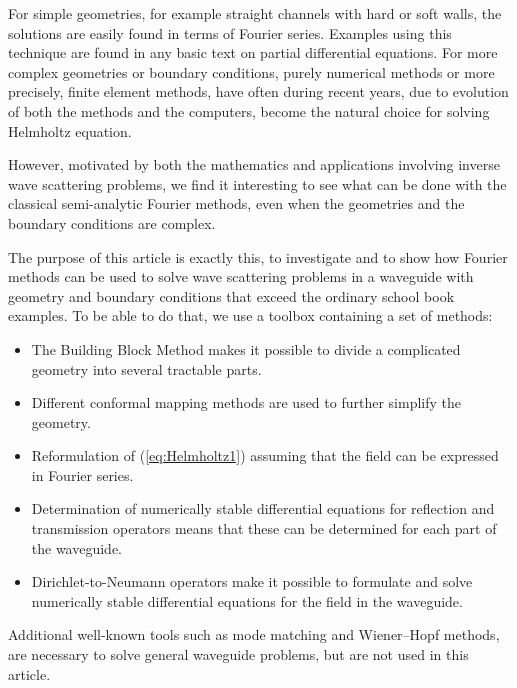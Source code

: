 \documentclass[numreferences]{kluwer}
\begin{document}
For simple geometries, for example straight channels with hard or soft
walls, the solutions are easily found in terms of Fourier
series. Examples using this technique are found in any basic text on
partial differential equations. For more complex geometries or
boundary conditions, purely numerical methods or more precisely,
finite element methods, have often during recent years, due to
evolution of both the methods and the computers, become the natural
choice for solving Helmholtz equation.


However, motivated by both the mathematics and applications involving
inverse wave scattering problems, we find it interesting to see what
can be done with the classical semi-analytic Fourier methods, even
when the geometries and the boundary conditions are complex.

The purpose of this article is exactly this, to investigate and to
show how Fourier methods can be used to solve wave scattering problems
in a waveguide with geometry and boundary conditions that exceed the
ordinary school book examples. To be able to do that, we use a toolbox
containing a set of methods:
\begin{itemize}
\item The Building Block Method makes it possible to divide a
  complicated geometry into several tractable parts.
\item Different conformal mapping methods are used to further simplify
  the geometry.
\item Reformulation of (\ref{eq:Helmholtz1}) assuming that the field
  can be expressed in Fourier series.
\item Determination of numerically stable differential equations for
  reflection and transmission operators means that these can be
  determined for each part of the waveguide.
\item Dirichlet-to-Neumann operators make it possible to formulate and
  solve numerically stable differential equations for the field in the
  waveguide.
\end{itemize}

Additional well-known tools such as mode matching and Wiener--Hopf
methods, are necessary to solve general waveguide problems, but are
not used in this article.
\end{document}
